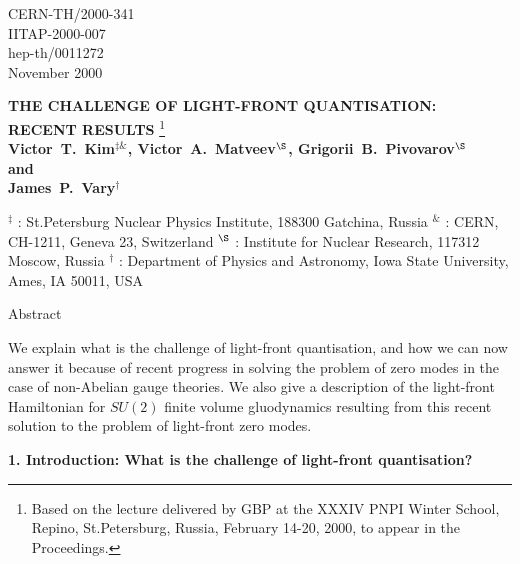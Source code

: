 \documentclass[a4paper,12pt]{article}
\begin{document}
\begin{flushright}
CERN-TH/2000-341 \\
IITAP-2000-007 \\
hep-th/0011272 \\
November  2000
\end{flushright}
\vspace*{0.7cm}
\begin{center}
{\bf THE CHALLENGE OF LIGHT-FRONT QUANTISATION: \\
RECENT RESULTS}
\footnote{Based on the lecture delivered by GBP at 
the XXXIV PNPI Winter School, Repino, St.Petersburg, Russia, 
February 14-20, 2000, to appear in the Proceedings.}\\ 
\vspace*{1cm}
{ \bf Victor~T.~Kim${}^{\ddagger \&}$, Victor~A.~Matveev${}^{\S}$,
Grigorii~B.~Pivovarov${}^{\S }$ \\
{\rm and} \\
James~P.~Vary${}^{\dagger}$}  \\
\vspace*{0.7cm}
\end{center}
${}^\ddagger$ : St.Petersburg Nuclear Physics Institute,
188300 Gatchina, Russia
\newline
${}^\&$ : CERN, CH-1211, Geneva 23, Switzerland
\newline
${}^\S$ : Institute for Nuclear Research, 117312 Moscow, Russia
\newline
${}^\dagger$ : Department of Physics and Astronomy,
Iowa State University, \\ 
\hspace*{0.45cm} Ames, IA 50011, USA


\begin{center}
Abstract
\end{center}

We explain what is the challenge of light-front quantisation, 
and how we can now answer it because of recent progress 
in solving the problem of zero modes in the case of non-Abelian 
gauge theories. We also give a description of the 
light-front Hamiltonian for $SU(2)$ finite volume gluodynamics 
resulting from this recent solution to the problem of 
light-front zero modes.


\vspace{1cm}
\newpage

{\bf 1. Introduction: What is the challenge of 
light-front quantisation? }\\
\end{document}

